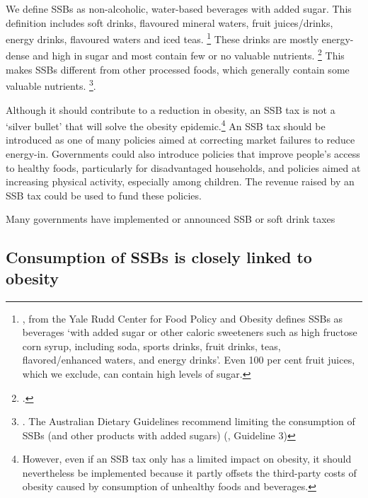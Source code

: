 \documentclass[embargoed]{grattan}
\begin{document}
We define SSBs as non-alcoholic, water-based beverages with added sugar. This definition includes soft drinks, flavoured mineral waters, fruit juices/drinks, energy drinks, flavoured waters and iced teas.%
\footnote{\textcite{Friedman2012Sugarsweetenedbeverage}, from the Yale Rudd Center for Food Policy and Obesity defines SSBs as beverages `with added sugar or other caloric sweeteners such as high fructose corn syrup, including soda, sports drinks, fruit drinks, teas, flavored/enhanced waters, and energy drinks'.
Even 100 per cent fruit juices, which we exclude, can contain high levels of sugar.} These drinks are mostly energy-dense and high in sugar and most contain few or no valuable nutrients.%
\footcites{Kaplin2013Usingeconomicpolicy}{Mozaffarian2016politicssciencesoda} This makes SSBs different from other processed foods, which generally contain some valuable nutrients.%
\footnote{\textcite{LordanShouldweput}.
The Australian Dietary Guidelines recommend limiting the consumption of SSBs (and other products with added sugars) (\textcite{Health2013AustralianDietaryGuidelines}, Guideline 3)}.

Although it should contribute to a reduction in obesity, an SSB tax is not a `silver bullet' that will solve the obesity epidemic.\footnote{However, even if an SSB tax only has a limited impact on obesity, it should nevertheless be implemented because it partly offsets the third-party costs of obesity caused by consumption of unhealthy foods and beverages.} An SSB tax should be introduced as one of many policies aimed at correcting market failures to reduce energy-in.
Governments could also introduce policies that improve people's access to healthy foods, particularly for disadvantaged households, and policies aimed at increasing physical activity, especially among children.
The revenue raised by an SSB tax could be used to fund these policies.


\begin{table}
\caption{Many governments have implemented or announced SSB or soft drink taxes}\label{tbl:SSB-taxes-by-country}




\end{table}

\subsection{Consumption of SSBs is closely linked to obesity}\label{subsec:consumption-of-ssbs-is-closely-linked-to-obesity}
\end{document}
